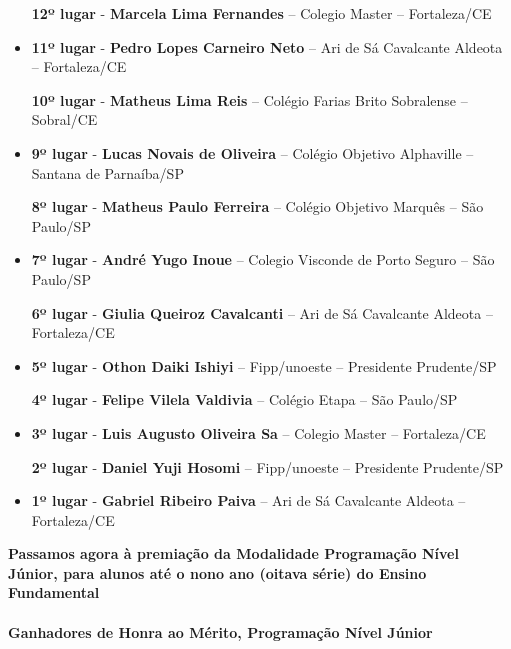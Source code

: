 \documentclass{article}
\begin{document}
\begin{itemize}
\textbf{12º lugar} - \textbf{Marcela Lima Fernandes} – Colegio Master – Fortaleza/CE



\item
\textbf{11º lugar} - \textbf{Pedro Lopes Carneiro Neto} – Ari de Sá Cavalcante Aldeota – Fortaleza/CE


\textbf{10º lugar} - \textbf{Matheus Lima Reis} – Colégio Farias Brito Sobralense – Sobral/CE



\item
\textbf{9º lugar} - \textbf{Lucas Novais de Oliveira} – Colégio Objetivo Alphaville – Santana de Parnaíba/SP


\textbf{8º lugar} - \textbf{Matheus Paulo Ferreira} – Colégio Objetivo Marquês – São Paulo/SP



\item
\textbf{7º lugar} - \textbf{André Yugo Inoue} – Colegio Visconde de Porto Seguro – São Paulo/SP


\textbf{6º lugar} - \textbf{Giulia Queiroz Cavalcanti} – Ari de Sá Cavalcante Aldeota – Fortaleza/CE



\item
\textbf{5º lugar} - \textbf{Othon Daiki Ishiyi} – Fipp/unoeste – Presidente Prudente/SP


\textbf{4º lugar} - \textbf{Felipe Vilela Valdivia} – Colégio Etapa – São Paulo/SP



\item
\textbf{3º lugar} - \textbf{Luis Augusto Oliveira Sa} – Colegio Master – Fortaleza/CE


\textbf{2º lugar} - \textbf{Daniel Yuji Hosomi} – Fipp/unoeste – Presidente Prudente/SP



\item
\textbf{1º lugar} - \textbf{Gabriel Ribeiro Paiva} – Ari de Sá Cavalcante Aldeota – Fortaleza/CE



\end{itemize}

\color{blue}
\textbf{Passamos agora à premiação da Modalidade Programação Nível Júnior, para alunos até o nono ano (oitava série) do Ensino Fundamental}\\\\
\textbf{\color{blue}Ganhadores de Honra ao Mérito, \color{black}Programação Nível Júnior}
\color{black}
\end{document}
